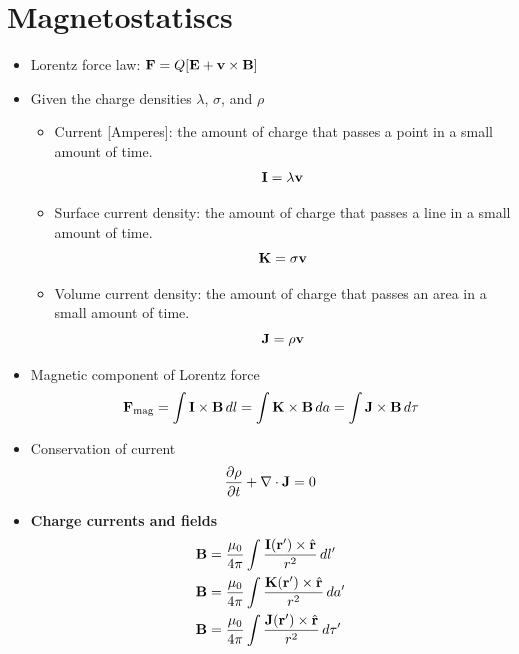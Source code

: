 \documentclass[a4paper,11pt]{report}
\begin{document}
\section{Magnetostatiscs}
\begin{itemize}

\item Lorentz force law: $\mathbf{F} = Q [\mathbf{E} + \mathbf{v} \times \mathbf{B} ]$

\item Given the charge densities $\lambda$, $\sigma$, and $\rho$
\begin{itemize}
\item Current [Amperes]: the amount of charge that passes a point in a small amount of time.
\begin{equation}
\mathbf{I} = \lambda \mathbf{v}
\end{equation}

\item Surface current density: the amount of charge that passes a line in a small amount of time.
\begin{equation}
\mathbf{K} = \sigma \mathbf{v}
\end{equation}

\item Volume current density: the amount of charge that passes an area in a small amount of time.
\begin{equation}
\mathbf{J} = \rho \mathbf{v}
\end{equation}
\end{itemize}

\item Magnetic component of Lorentz force
\begin{equation}
\mathbf{F}_{\text{mag}} = \int \mathbf{I} \times \mathbf{B} \, dl = \int \mathbf{K} \times \mathbf{B} \, da = \int \mathbf{J} \times \mathbf{B} \, d\tau
\end{equation}

\item Conservation of current
\begin{equation}
\frac{\partial \rho}{\partial t} + \nabla \cdot \mathbf{J} = 0
\end{equation}

\item \textbf{Charge currents and fields}
\begin{align}
\mathbf{B} &= \frac{\mu_0}{4\pi} \int \frac{\mathbf{I}(\mathbf{r}') \times \hat{\mathbf{r}}}{r^2}\, dl' \\
\mathbf{B} &= \frac{\mu_0}{4\pi} \int \frac{\mathbf{K}(\mathbf{r}') \times \hat{\mathbf{r}}}{r^2}\, da' \\
\mathbf{B} &= \frac{\mu_0}{4\pi} \int \frac{\mathbf{J}(\mathbf{r}') \times \hat{\mathbf{r}}}{r^2}\, d\tau' \label{eq:bfield_from_den}
\end{align}


\end{itemize}
\end{document}
